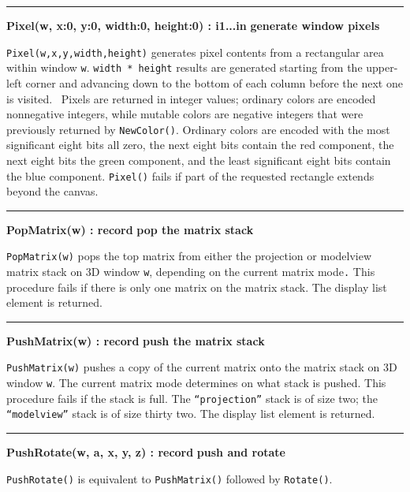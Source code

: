 \bigskip\hrule\vspace{0.1cm}
\noindent
{\bf Pixel(w, x:0, y:0, width:0, height:0) : i1...in } \hfill {\bf generate window pixels}

\noindent
\texttt{Pixel(w,x,y,width,height)} generates pixel contents from a
rectangular area within window \texttt{w}. \texttt{width * height}
results are generated starting from the upper-left corner and advancing
down to the bottom of each column before the next one is visited.
\ Pixels are returned in integer values; ordinary colors are encoded
nonnegative integers, while mutable colors are negative integers that
were previously returned by \texttt{NewColor()}. Ordinary colors are
encoded with the most significant eight bits all zero, the next eight
bits contain the red component, the next eight bits the green
component, and the least significant eight bits contain the blue
component. \texttt{Pixel()} fails if part of the requested rectangle
extends beyond the canvas.

\bigskip\hrule\vspace{0.1cm}
\noindent
{\bf PopMatrix(w) : record } \hfill {\bf pop the matrix stack}

\noindent
\texttt{PopMatrix(w)} pops the top matrix from either the projection or
modelview matrix stack on 3D window \texttt{w}, depending on the
current matrix mode\texttt{.} This procedure fails if there is only one
matrix on the matrix stack. The display list element is returned. 

\bigskip\hrule\vspace{0.1cm}
\noindent
{\bf PushMatrix(w) : record } \hfill {\bf push the matrix stack}

\noindent
\texttt{PushMatrix(w)} pushes a copy of the current matrix onto the
matrix stack on 3D window \texttt{w}. The current matrix mode
determines on what stack is pushed. This procedure fails if the stack
is full. The \texttt{{\textquotedblleft}projection{\textquotedblright}}
stack is of size two; the
\texttt{{\textquotedblleft}modelview{\textquotedblright}} stack is of
size thirty two. The display list element is returned.

\bigskip\hrule\vspace{0.1cm}
\noindent
{\bf PushRotate(w, a, x, y, z) : record } \hfill {\bf push and rotate}

\noindent
\texttt{PushRotate()} is equivalent to \texttt{PushMatrix()} followed by
\texttt{Rotate()}.

